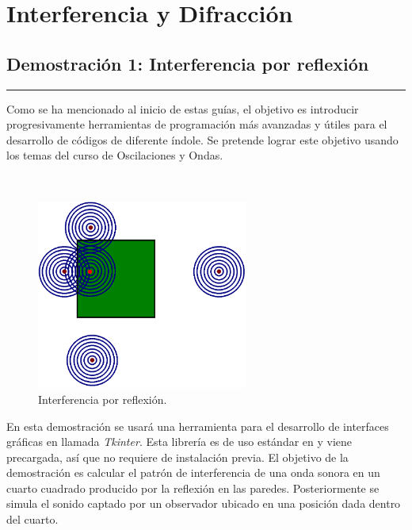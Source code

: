 \chapter{Interferencia y Difracción}
\label{cha:optic}





\section{Demostración 1: Interferencia por reflexión}
\label{sec:DEMO4_01}
\rule{14cm}{0.5mm}

Como se ha mencionado al inicio de estas guías, el objetivo es introducir 
progresivamente herramientas de programación más avanzadas y útiles para
el desarrollo de códigos de diferente índole. Se pretende lograr este 
objetivo usando los temas del curso de Oscilaciones y Ondas.

\
\begin{figure}[htbp]
	\centering
	\includegraphics[width=0.62\textwidth]
	{./pictures/sound_interference.png}

	\caption{\small{Interferencia por reflexión.}}
	
	\label{fig:reflex_interference}
\end{figure}


En esta demostración se usará una herramienta para el desarrollo de 
interfaces gráficas en \python llamada \textit{Tkinter}. Esta librería es
de uso estándar en \python y viene precargada, así que no requiere de 
instalación previa. El objetivo de la demostración es calcular el patrón 
de interferencia de una onda sonora en un cuarto cuadrado producido por la
reflexión en las paredes. Posteriormente se simula el sonido captado por
un observador ubicado en una posición dada dentro del cuarto.


